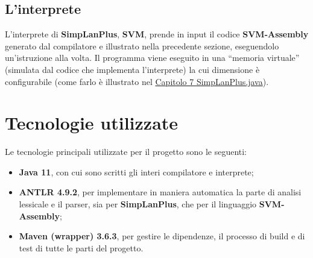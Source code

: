 \documentclass[../report.tex]{subfiles}
\begin{document}
\subsection{L'interprete}\label{ss:interprete}
L'interprete di \textbf{SimpLanPlus}, \textbf{SVM}, prende in input il codice \textbf{SVM-Assembly} generato dal compilatore e illustrato nella precedente sezione, eseguendolo un'istruzione alla volta.
Il programma viene eseguito in una ``memoria virtuale'' (simulata dal codice che implementa l'interprete) la cui dimensione è configurabile (come farlo è illustrato nel \hyperref[c:simplanplus-java]{Capitolo 7 SimpLanPlus.java}).

\section{Tecnologie utilizzate}\label{s:teconologie-utilizzate}
Le tecnologie principali utilizzate per il progetto sono le seguenti:
\begin{itemize}
    \item \textbf{Java 11}, con cui sono scritti gli interi compilatore e interprete;
    \item \textbf{ANTLR 4.9.2}, per implementare in maniera automatica la parte di analisi lessicale e il parser, sia per \textbf{SimpLanPlus}, che per il linguaggio \textbf{SVM-Assembly};
    \item \textbf{Maven (wrapper) 3.6.3}, per gestire le dipendenze, il processo di build e di test di tutte le parti del progetto.
\end{itemize}
\end{document}
